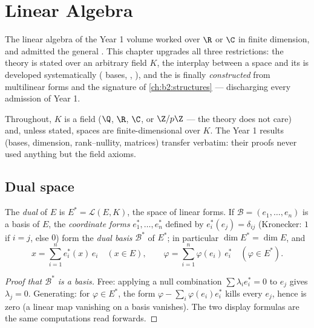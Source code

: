 \chapter{Linear Algebra}\label{ch:b2:linalg}

The linear algebra of the Year 1 volume worked over $\R$ or $\C$ in
finite dimension, and admitted the general . This chapter
upgrades all three restrictions: the theory is stated over an
arbitrary field $K$, the interplay between a space and its
\emph{} is developed systematically ( bases, ,
), and the  is finally \emph{constructed} from
 multilinear forms and the signature of
\cref{ch:b2:structures} --- discharging every admission of Year 1.

Throughout, $K$ is a field ($\Q$, $\R$, $\C$, or $\Z/p\Z$ --- the
theory does not care) and, unless stated, spaces are
finite-dimensional over $K$. The Year 1 results (bases, dimension,
rank--nullity, matrices) transfer verbatim: their proofs never used
anything but the field axioms.

\section{Dual space}

\begin{definition}\label{def:b2:linalg:dual}
The \emph{dual} of $E$ is $E^* = \mathcal{L}(E,
K)$, the space of linear forms. If $\mathcal{B} = (e_1, \dots, e_n)$
is a basis of $E$, the \emph{coordinate forms} $e_1^*, \dots, e_n^*$
defined by $e_i^*(e_j) = \delta_{ij}$ (Kronecker: $1$ if $i = j$,
else $0$) form the \emph{dual basis}
$\mathcal{B}^*$ of $E^*$; in particular $\dim E^* = \dim E$, and
\[
x = \sum_{i=1}^{n} e_i^*(x)\, e_i \quad (x \in E),
\qquad
\varphi = \sum_{i=1}^{n} \varphi(e_i)\, e_i^* \quad (\varphi \in
E^*).
\]
\end{definition}

\begin{proof}[Proof that $\mathcal{B}^*$ is a basis]
Free: applying a null combination $\sum \lambda_i e_i^* = 0$ to
$e_j$ gives $\lambda_j = 0$. Generating: for $\varphi \in E^*$, the
form $\varphi - \sum_i \varphi(e_i) e_i^*$ kills every $e_j$, hence
is zero (a linear map vanishing on a basis vanishes). The two
display formulas are the same computations read forwards.
\end{proof}

